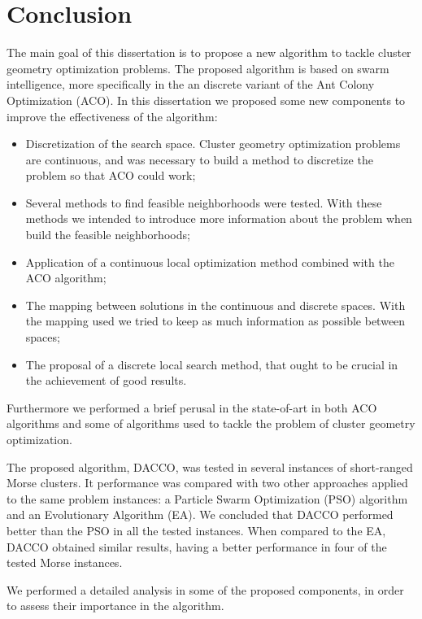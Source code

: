 \chapter{Conclusion}
\label{chap:conclusions}


The main goal of this dissertation is to propose a new algorithm to tackle cluster geometry optimization problems. The proposed algorithm is based on swarm intelligence, more specifically in the an discrete variant of the Ant Colony Optimization (ACO). In this dissertation we proposed some new components to improve the effectiveness of the algorithm:
\begin{itemize}
	\item Discretization of the search space. Cluster geometry optimization problems are continuous, and was necessary to build a method to discretize the problem so that ACO could work;
	\item Several methods to find feasible neighborhoods were tested. With these methods we intended to introduce more information about the problem when build the feasible neighborhoods;
	\item Application of a continuous local optimization method combined with the ACO algorithm;
	\item The mapping between solutions in the continuous and discrete spaces. With the mapping used we tried to keep as much information as possible between spaces;
	\item The proposal of a discrete local search method, that ought to be crucial in the achievement of good results.
\end{itemize}

Furthermore we performed a brief perusal in the state-of-art in both ACO algorithms and some of algorithms used to tackle the problem of cluster geometry optimization.

The proposed algorithm, DACCO, was tested in several instances of short-ranged Morse clusters. It performance was compared with two other approaches applied to the same problem instances: a Particle Swarm Optimization (PSO) algorithm and an Evolutionary Algorithm (EA). We concluded that DACCO performed better than the PSO in all the tested instances. When compared to the EA, DACCO obtained similar results, having a better performance in four of the tested Morse instances.

We performed a detailed analysis in some of the proposed components, in order to assess their importance in the algorithm.

